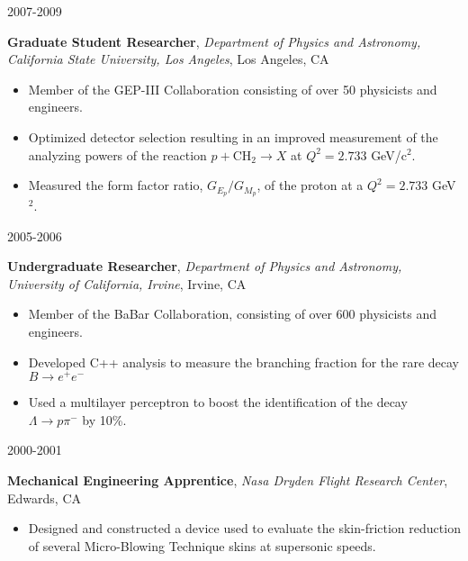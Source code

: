 \documentclass[10pt]{article}
\newcommand{\experienceentry}[5] { 
    \noindent
    \begin{minipage}[t]{0.15\textwidth} \begin{flushright} #1 \end{flushright} \end{minipage} \hspace{0.01\textwidth}
    \begin{minipage}[t]{0.84\textwidth} 
        \textbf{#2}, \emph{#3}, #4 
        #5
    \end{minipage}
}
\begin{document}
        \experienceentry{2007-2009}
                        {Graduate Student Researcher}
                        {Department of Physics and Astronomy, California State University, Los Angeles}
                        {Los Angeles, CA}
                        {
                          \begin{itemize}[label=\textcolor{indigodye}{$\circ$}, noitemsep, nolistsep, leftmargin=*]
                            \item Member of the GEP-III Collaboration consisting of over 50 physicists and engineers.
                            \item Optimized detector selection resulting in an improved measurement of the analyzing
                                powers of the reaction $p + \mbox{CH}_2 \rightarrow X$ at $Q^2 = 2.733$ GeV/c$^{2}$.
                            \item Measured the form factor ratio, $G_{E_p}/G_{M_p}$, of the proton at 
                                  a $Q^{2} = 2.733$ GeV$^{2}$.
                          \end{itemize}
                        } 
        \experienceentry{2005-2006}
                        {Undergraduate Researcher}
                        {Department of Physics and Astronomy, University of California, Irvine}
                        {Irvine, CA}
                        { 
                          \begin{itemize}[label=\textcolor{indigodye}{$\circ$}, noitemsep, nolistsep, leftmargin=*]
                            \item Member of the BaBar Collaboration, consisting of over 600 physicists and engineers.
                            \item Developed C++ analysis to measure the branching fraction for the rare decay 
                                  $B\rightarrow e^+e^-$
                            \item Used a multilayer perceptron to boost the identification of the decay 
                                  $\Lambda \rightarrow p \pi^-$ by 10\%.  
                          \end{itemize}
                       }
        \experienceentry{2000-2001}
                        {Mechanical Engineering Apprentice}
                        {Nasa Dryden Flight Research Center}
                        {Edwards, CA}
                        {
                          \begin{itemize}[label=\textcolor{indigodye}{$\circ$}, noitemsep, nolistsep, leftmargin=*]
                            \item Designed and constructed a device used to evaluate the skin-friction reduction 
                                  of several Micro-Blowing Technique skins at supersonic speeds. 
                          \end{itemize}
                       }
\end{document}
